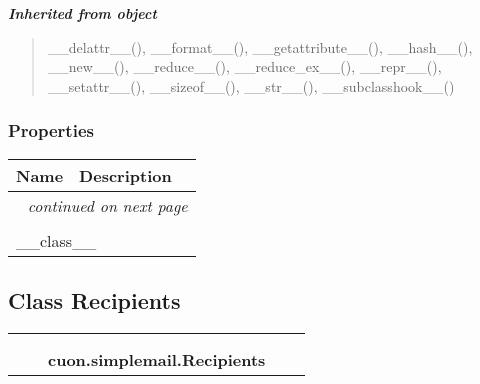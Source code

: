 \large{\textbf{\textit{Inherited from object}}}

\begin{quote}
\_\_delattr\_\_(), \_\_format\_\_(), \_\_getattribute\_\_(), \_\_hash\_\_(), \_\_new\_\_(), \_\_reduce\_\_(), \_\_reduce\_ex\_\_(), \_\_repr\_\_(), \_\_setattr\_\_(), \_\_sizeof\_\_(), \_\_str\_\_(), \_\_subclasshook\_\_()
\end{quote}


  \subsubsection{Properties}

    \vspace{-1cm}
\hspace{\varindent}\begin{longtable}{|p{\varnamewidth}|p{\vardescrwidth}|l}
\cline{1-2}
\cline{1-2} \centering \textbf{Name} & \centering \textbf{Description}& \\
\cline{1-2}
\endhead\cline{1-2}\multicolumn{3}{r}{\small\textit{continued on next page}}\\\endfoot\cline{1-2}
\endlastfoot\multicolumn{2}{|l|}{\textit{Inherited from object}}\\
\multicolumn{2}{|p{\varwidth}|}{\raggedright \_\_class\_\_}\\
\cline{1-2}
\end{longtable}



\subsection{Class Recipients}

    \label{cuon:simplemail:Recipients}
\begin{tabular}{cccccc}
\multicolumn{2}{r}{\settowidth{\BCL}{object}\multirow{2}{\BCL}{object}}
&&
  \\\cline{3-3}
  &&\multicolumn{1}{c|}{}
&&
  \\
&&\multicolumn{2}{l}{\textbf{cuon.simplemail.Recipients}}
\end{tabular}

